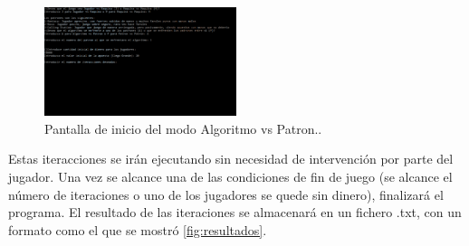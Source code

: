 \begin{figure}[h]
\centering
\includegraphics[width=0.5\textwidth]{figuras/C_MA.png}   
\caption{Pantalla de inicio del modo Algoritmo vs Patron..}
\label{fig:C_MA}
\end{figure}

Estas iteracciones se irán ejecutando sin necesidad de intervención por parte del jugador. Una vez se alcance una de las condiciones de fin de juego (se alcance el número de iteraciones o uno de los jugadores se quede sin dinero), finalizará el programa. El resultado de las iteraciones se almacenará en un fichero .txt, con un formato como el que se mostró \ref{fig:resultados}.